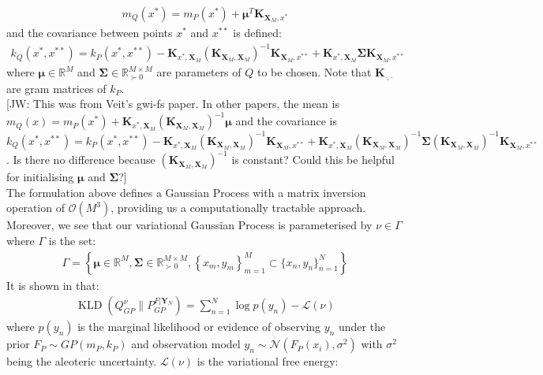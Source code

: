 \documentclass[twoside,11pt]{article}
\newcommand{\jw}[1]{{\color{gray} [JW: #1]}}
\newcommand{\KLD}{\operatorname{KLD}}
\begin{document}
\begin{align}
    m_Q(x^*) = m_P(x^*) + \mathbf{\mu}^T\mathbf{K}_{\mathbf{X}_M, x^*}
    \label{svgp-mean}
\end{align}
and the covariance between points $x^*$ and $x^{**}$ is defined:
\begin{align}
        k_Q(x^*, x^{**}) = k_P(x^*, x^{**}) - \mathbf{K}_{x^*, \mathbf{X}_M} \left(\mathbf{K}_{\mathbf{X}_M, \mathbf{X}_M}\right)^{-1}\mathbf{K}_{\mathbf{X}_M, x^{**}} + \mathbf{K}_{x^*, \mathbf{X}_M} \mathbf{\Sigma}\mathbf{K}_{\mathbf{X}_M, x^{**}}
    \label{svgp-covariance}
\end{align}
where $\mathbf{\mu} \in \mathbb{R}^{M}$ and $\mathbf{\Sigma} \in \mathbb{R}^{M\times M}_{\succ 0}$ are parameters of $Q$ to be chosen. Note that $\mathbf{K}_{\cdot, \cdot}$ are gram matrices of $k_P$.
\\\jw{This was from Veit's gwi-fs paper. In other papers, the mean is $m_Q(x) =  m_P(x^*) + \mathbf{K}_{x^*, \mathbf{X}_M} \left(\mathbf{K}_{\mathbf{X}_M, \mathbf{X}_M}\right)^{-1} \mathbf{\mu}$ and the covariance is $k_Q(x^*, x^{**}) = k_P(x^*, x^{**}) - \mathbf{K}_{x^*, \mathbf{X}_M} \left(\mathbf{K}_{\mathbf{X}_M, \mathbf{X}_M}\right)^{-1}\mathbf{K}_{\mathbf{X}_M, x^{**}} + \mathbf{K}_{x^*, \mathbf{X}_M} \left(\mathbf{K}_{\mathbf{X}_M, \mathbf{X}_M}\right)^{-1} \mathbf{\Sigma}\left(\mathbf{K}_{\mathbf{X}_M, \mathbf{X}_M}\right)^{-1}\mathbf{K}_{\mathbf{X}_M, x^{**}}$. Is there no difference because $\left(\mathbf{K}_{\mathbf{X}_M, \mathbf{X}_M}\right)^{-1}$ is constant? Could this be helpful for initialising $\mathbf{\mu}$ and $\mathbf{\Sigma}$?}
\\The formulation above defines a Gaussian Process with a matrix inversion operation of $\mathcal{O}(M^3)$, providing us a computationally tractable approach. Moreover, we see that our variational Gaussian Process is parameterised by $\nu \in \Gamma$ where $\Gamma$ is the set:
\begin{align}
    \Gamma = \left\{\mathbf{\mu} \in \mathbb{R}^{M}, \mathbf{\Sigma} \in \mathbb{R}^{M\times M}_{\succ 0}, \left\{x_m, y_m\right\}_{m=1}^{M} \subset \{x_n, y_n\}_{n=1}^{N}\right\}
    \label{svgp-parameter-set}
\end{align} 
It is shown in \cite{matthews2016sparse} that:
\begin{align}
    \KLD\left(Q_{GP}^{\nu} \Big\| P_{GP}^{F \vert \mathbf{Y}_N} \right) = \sum_{n=1}^N\log p(y_n) - \mathcal{L}(\nu)
    \label{svgp-kld-loss-equivalence}
\end{align}
where $p(y_n)$ is the marginal likelihood or evidence of observing $y_n$ under the prior $F_P \sim GP(m_P, k_P)$ and observation model $y_n \sim \mathcal{N}(F_P(x_i), \sigma^2)$ with $\sigma^2$ being the aleoteric uncertainty. $\mathcal{L}(\nu)$ is the variational free energy:
\end{document}
